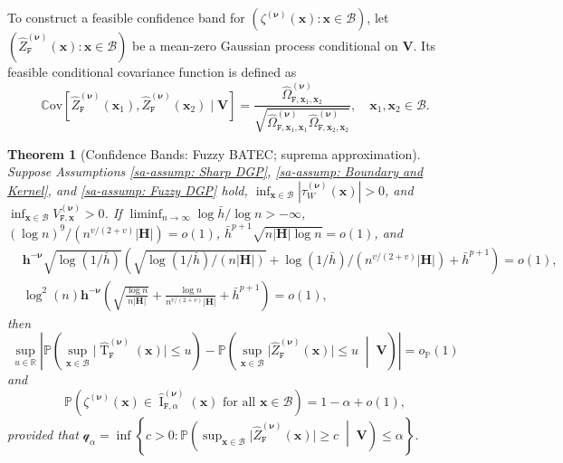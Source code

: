 \documentclass[10pt]{article}
\newtheorem{thm}{Theorem}
\DeclareMathOperator{\Tstat}{T}
\DeclareMathOperator{\CI}{I}
\renewcommand{\P}{\mathbb{P}}
\newcommand{\Cov}{\mathbb{C}\mathrm{ov}}
\newcommand{\reals}{\mathbb{R}}
\newcommand{\bh}{\mathbf{h}}
\newcommand{\bH}{\mathbf{H}}
\newcommand{\bV}{\mathbf{V}}
\newcommand{\bx}{\mathbf{x}}
\newcommand{\bnu}{\boldsymbol{\nu}}
\newcommand{\B}{\mathcal{B}}
\newcommand{\q}{\mathcal{q}}
\begin{document}
To construct a feasible confidence band for $(\zeta^{(\bnu)}(\bx): \bx \in \B)$, let $(\widehat{Z}^{(\bnu)}_{\mathtt{F}}(\bx): \bx \in \B)$ be a mean-zero Gaussian process conditional on $\bV$. Its feasible conditional covariance function is defined as
\begin{equation*}
    \Cov \left[ \widehat{Z}^{(\bnu)}_{\mathtt{F}}(\bx_1), \widehat{Z}^{(\bnu)}_{\mathtt{F}}(\bx_2) \mid \bV \right]
    = \frac{\widehat{\Omega}_{\mathtt{F}, \bx_1, \bx_2}^{(\bnu)}}{\sqrt{\widehat{\Omega}_{\mathtt{F}, \bx_1, \bx_1}^{(\bnu)} \widehat{\Omega}_{\mathtt{F}, \bx_2, \bx_2}^{(\bnu)}}},
    \quad \bx_1, \bx_2 \in \B.
\end{equation*}

\begin{thm}[Confidence Bands: Fuzzy BATEC; suprema approximation]\label{sa-thm: Confidence Bands: Fuzzy BATEC -- suprema}
    Suppose Assumptions \ref{sa-assump: Sharp DGP}, \ref{sa-assump: Boundary and Kernel}, and \ref{sa-assump: Fuzzy DGP} hold, $\inf_{\bx \in \B} |\tau^{(\bnu)}_W(\bx)| > 0$, and $\inf_{\bx\in\B}V_{\mathtt{F},\bx}^{(\bnu)}>0$. If $\liminf_{n \to \infty} \log \bar{h}/\log n > -\infty$, $(\log n)^9/(n^{v/(2+v)} |\bH|) = o(1)$, $\bar{h}^{p+1} \sqrt{n |\bH|\log n} = o(1)$, and
    \begin{align*}
        &\bh^{-\bnu}\sqrt{\log(1/\bar{h})}
        \left(\sqrt{\log(1/\bar{h})/(n|\bH|)}+
        \log(1/\bar{h})/(n^{v/(2+v)}|\bH|)+\bar{h}^{p+1}\right)=o(1),\\
        &\log^2(n)\bh^{-\bnu}
        \left(
        \sqrt{\frac{\log n}{n|\bH|}}
        +\frac{\log n}{n^{v/(2+v)}|\bH|}
        +\bar h^{p+1}
        \right)=o(1),
    \end{align*}
    then
    \begin{equation*}
        \sup_{u \in \reals} \left| \P \left( \sup_{\bx \in \B} \big| \widehat{\Tstat}_{\mathtt{F}}^{(\bnu)}(\bx) \big| \leq u \right) - \P \left( \sup_{\bx \in \B} \big| \widehat{Z}_{\mathtt{F}}^{(\bnu)}(\bx) \big| \leq u \;\middle|\; \bV \right) \right| = o_{\P}(1)
    \end{equation*}
    and
    \begin{equation*}
        \P \left( \zeta^{(\bnu)}(\bx) \in \widehat{\CI}_{\mathtt{F},\alpha}^{(\bnu)}(\bx) \text{ for all } \bx \in \B \right) = 1 - \alpha + o(1),
    \end{equation*}
    provided that $\q_{\alpha} = \inf \left\{ c > 0 : \P \left( \sup_{\bx \in \B} \big| \widehat{Z}_{\mathtt{F}}^{(\bnu)}(\bx) \big| \geq c \;\middle|\; \bV \right) \leq \alpha \right\}$.
\end{thm}
\end{document}
